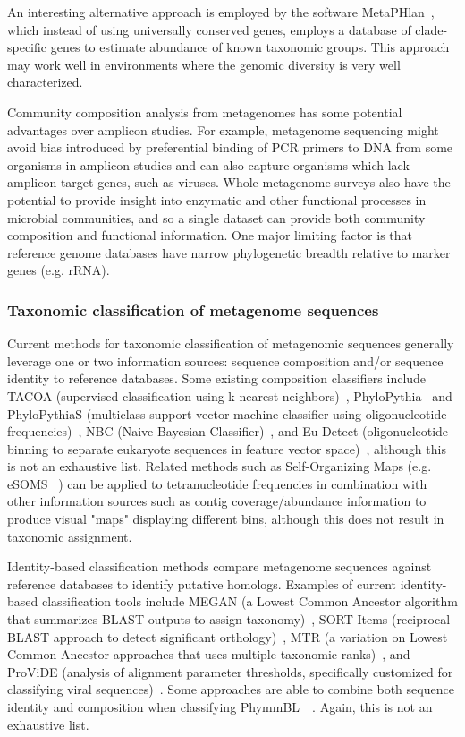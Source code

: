 \documentclass[10pt]{article}
\begin{document}
An interesting alternative approach is employed by the software MetaPHlan~\cite{Segata2012}, which instead of using universally conserved genes, employs a database of clade-specific genes to estimate abundance of known taxonomic groups. This approach may work well in environments where the genomic diversity is very well characterized.

Community composition analysis from metagenomes has some potential advantages over amplicon studies.
For example, metagenome sequencing might avoid bias introduced by preferential binding of PCR primers to DNA from some organisms in amplicon studies and can also capture organisms which lack amplicon target genes, such as viruses.
Whole-metagenome surveys also have the potential to provide insight into enzymatic and other functional processes in microbial communities, and so a single dataset can provide both community composition and functional information. 
One major limiting factor is that reference genome databases have narrow phylogenetic breadth relative to marker genes (e.g. rRNA). 

\subsubsection*{Taxonomic classification of metagenome sequences}
Current methods for taxonomic classification of metagenomic sequences generally leverage one or two information sources: sequence composition and/or sequence identity to reference databases. 
Some existing composition classifiers include TACOA (supervised classification using k-nearest neighbors)~\cite{Diaz2009}, PhyloPythia~\cite{Mchardy2006} and PhyloPythiaS (multiclass support vector machine classifier using oligonucleotide frequencies)~\cite{Patil2011}, NBC (Naive Bayesian Classifier)~\cite{Rosen2011}, and Eu-Detect (oligonucleotide binning to separate eukaryote sequences in feature vector space)~\cite{Mohammed2011}, although this is not an exhaustive list. 
Related methods such as Self-Organizing Maps (e.g. eSOMS ~\cite {Dick2009}) can be applied to tetranucleotide frequencies in combination with other information sources such as contig coverage/abundance information to produce visual "maps" displaying different bins, although this does not result in taxonomic assignment. 

Identity-based classification methods compare metagenome sequences against reference databases to identify putative homologs. 
Examples of current identity-based classification tools include MEGAN (a Lowest Common Ancestor algorithm that summarizes BLAST outputs to assign taxonomy)~\cite{Huson2007}, SORT-Items (reciprocal BLAST approach to detect significant orthology)~\cite{Haque2009}, MTR (a variation on Lowest Common Ancestor approaches that uses multiple taxonomic ranks)~\cite{Gori2011}, and ProViDE (analysis of alignment parameter thresholds, specifically customized for classifying viral sequences)~\cite{Ghosh2011}. Some approaches are able to combine both sequence identity and composition when classifying PhymmBL~\cite{Brady2009}~\cite{Brady2011}.
Again, this is not an exhaustive list.
\end{document}
